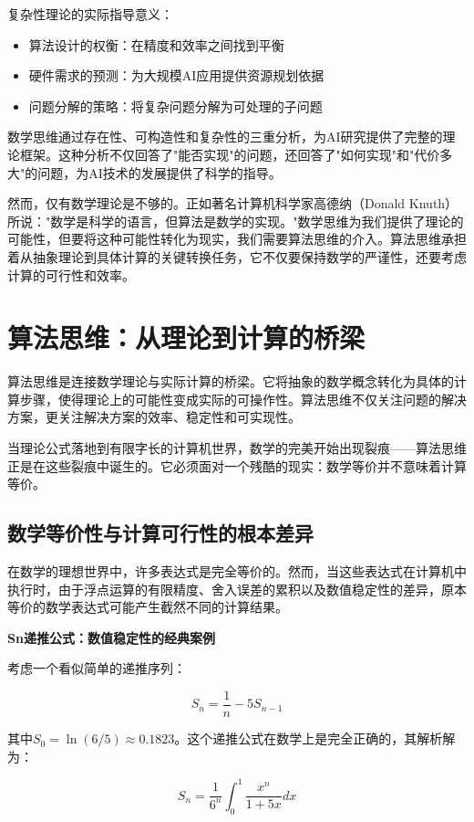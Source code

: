 复杂性理论的实际指导意义：

\begin{itemize}
\item 算法设计的权衡：在精度和效率之间找到平衡
\item 硬件需求的预测：为大规模AI应用提供资源规划依据  
\item 问题分解的策略：将复杂问题分解为可处理的子问题
\end{itemize}

数学思维通过存在性、可构造性和复杂性的三重分析，为AI研究提供了完整的理论框架。这种分析不仅回答了"能否实现"的问题，还回答了"如何实现"和"代价多大"的问题，为AI技术的发展提供了科学的指导。

然而，仅有数学理论是不够的。正如著名计算机科学家高德纳（Donald Knuth）所说："数学是科学的语言，但算法是数学的实现。"数学思维为我们提供了理论的可能性，但要将这种可能性转化为现实，我们需要算法思维的介入。算法思维承担着从抽象理论到具体计算的关键转换任务，它不仅要保持数学的严谨性，还要考虑计算的可行性和效率。

\section{算法思维：从理论到计算的桥梁}

算法思维是连接数学理论与实际计算的桥梁。它将抽象的数学概念转化为具体的计算步骤，使得理论上的可能性变成实际的可操作性。算法思维不仅关注问题的解决方案，更关注解决方案的效率、稳定性和可实现性。

当理论公式落地到有限字长的计算机世界，数学的完美开始出现裂痕——算法思维正是在这些裂痕中诞生的。它必须面对一个残酷的现实：数学等价并不意味着计算等价。

\subsection{数学等价性与计算可行性的根本差异}

在数学的理想世界中，许多表达式是完全等价的。然而，当这些表达式在计算机中执行时，由于浮点运算的有限精度、舍入误差的累积以及数值稳定性的差异，原本等价的数学表达式可能产生截然不同的计算结果。

\textbf{Sn递推公式：数值稳定性的经典案例}

考虑一个看似简单的递推序列：

$$S_n = \frac{1}{n} - 5S_{n-1}$$

其中$S_0 = \ln(6/5) \approx 0.1823$。这个递推公式在数学上是完全正确的，其解析解为：

$$S_n = \frac{1}{6^n} \int_0^1 \frac{x^n}{1+5x} dx$$

